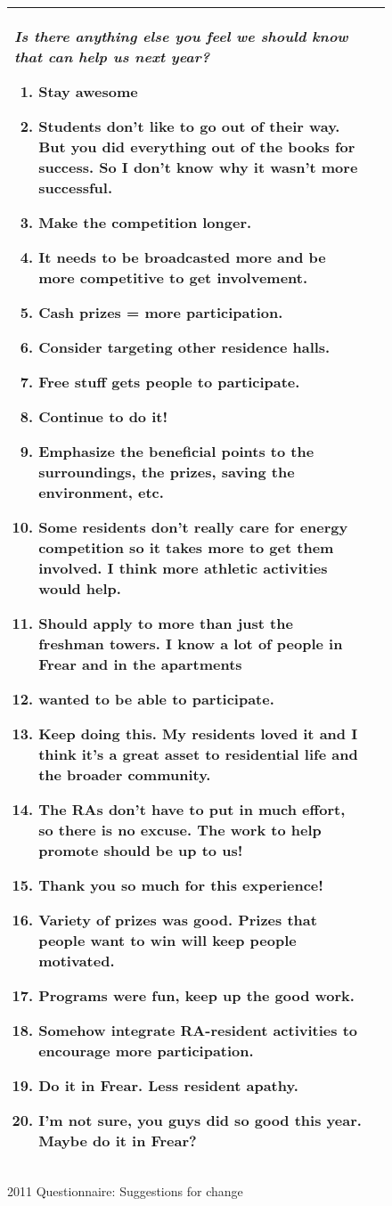 \documentclass[]{IEEEconf}
\begin{document}
\begin{figure*}[th!]
\begin{tabular}{|l|l|}
\small  \begin{minipage}[t]{3in}
{\em Is there anything else you feel we should know that can help us next year?  }
\begin{enumerate}
\item Stay awesome
\item Students don't like to go out of their way.  But you did everything out of the books
  for success. So I don't know why it wasn't more successful.
\item Make the competition longer. 
\item It needs to be broadcasted more and be more competitive to get involvement. 
\item Cash prizes = more participation.
\item Consider targeting other residence halls. 
\item Free stuff gets people to participate.
\item Continue to do it!
\item Emphasize the beneficial points to the surroundings, the prizes, saving the environment, etc. 
\item Some residents don't really care for energy competition so it takes more to get them involved.   I think more 
athletic activities would help.
\item Should apply to more than just the freshman towers.  I know a lot of people in Frear and in the apartments 
\item wanted to be able to participate.
\item Keep doing this. My residents  loved it and I think it's a great asset to residential life and the broader community.
\item The RAs don't have to put in much effort, so there is no excuse.  The work to help promote should be up to us!  
\item Thank you so much for this experience!
\item Variety of prizes was good.  Prizes that people want to win will keep people motivated.
\item Programs were fun, keep up the good work.
\item Somehow integrate RA-resident activities to encourage more participation.
\item Do it in Frear.  Less resident apathy.
\item I'm not sure, you guys did so good this year.  Maybe do it in Frear?
\end{enumerate}
\end{minipage}  \normalsize
\\
\hline
\end{tabular}
\caption{2011 Questionnaire: Suggestions for change}
\label{fig:ra-suggestions-2011}
\end{figure*}
\end{document}
